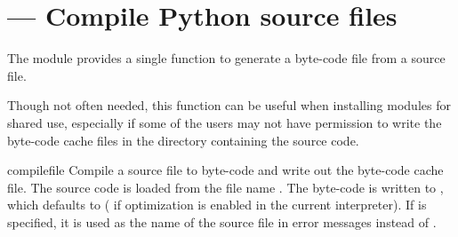 \section{ ---
         Compile Python source files}





The  module provides a single function to generate
a byte-code file from a source file.

Though not often needed, this function can be useful when installing
modules for shared use, especially if some of the users may not have
permission to write the byte-code cache files in the directory
containing the source code.


\begin{funcdesc}{compile}{file}
  Compile a source file to byte-code and write out the byte-code cache 
  file.  The source code is loaded from the file name .  The 
  byte-code is written to , which defaults to 
  \code{+}  ( if optimization is enabled in the
  current interpreter).  If  is specified, it is used as
  the name of the source file in error messages instead of . 
\end{funcdesc}


\begin{seealso}
\end{seealso}
